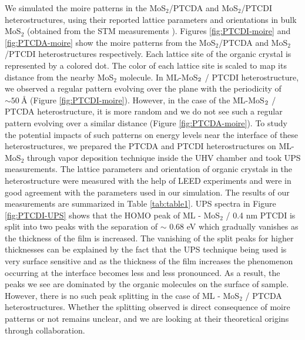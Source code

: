 \documentclass[12pt]{article}
\begin{document}
We simulated the moire patterns in the MoS$_2$/PTCDA and MoS$_2$/PTCDI heterostructures, using their reported lattice parameters and orientations in bulk MoS$_2$ (obtained from the STM measurements \cite{ludwig1994stm}). Figures \ref{fig:PTCDI-moire} and \ref{fig:PTCDA-moire} show the moire patterns from the MoS$_2$/PTCDA and MoS$_2$/PTCDI heterostructures respectively. Each lattice site of the organic crystal is represented by a colored dot. The color of each lattice site is scaled to map its distance from the nearby MoS$_2$ molecule. In ML-MoS$\protect_2$ / PTCDI heterostructure, we observed a regular pattern evolving over the plane with the periodicity of $\sim \SI{50}{\angstrom}$ (Figure \ref{fig:PTCDI-moire}). However, in the case of the ML-MoS$\protect_2$ / PTCDA heterostructure, it is more random and we do not see such a regular pattern evolving over a similar distance (Figure \ref{fig:PTCDA-moire}). To study the potential impacts of such patterns on energy levels near the interface of these heterostructures, we prepared the PTCDA and PTCDI heterostructures on ML-MoS$_2$ through vapor deposition technique inside the UHV chamber and took UPS measurements. The lattice parameters and orientation of organic crystals in the heterostructure were measured with the help of LEED experiments and were in good agreement with the parameters used in our simulation. The results of our measurements are summarized in Table \ref{tab:table1}. UPS spectra in Figure \ref{fig:PTCDI-UPS} shows that the HOMO peak of ML - MoS$_2$ / 0.4 nm PTCDI is split into two peaks with the separation of $\sim$ 0.68 eV which gradually vanishes as the thickness of the film is increased. The vanishing of the split peaks for higher thicknesses can be explained by the fact that the UPS technique being used is very surface sensitive and as the thickness of the film increases the phenomenon occurring at the interface becomes less and less pronounced. As a result, the peaks we see are dominated by the organic molecules on the surface of sample. However, there is no such peak splitting in the case of ML - MoS$_2$ / PTCDA heterostructures. Whether the splitting observed is direct consequence of moire patterns or not remains unclear, and we are looking at their theoretical origins through collaboration.
\end{document}
